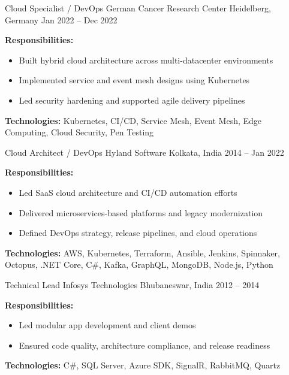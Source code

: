 \begin{cventries}
\cventry
  {Cloud Specialist / DevOps}
  {German Cancer Research Center}
  {Heidelberg, Germany}
  {Jan 2022 – Dec 2022}
  {
    \begin{cvitems}
      \item {\textbf{Responsibilities:}
        \begin{itemize}
          \item Built hybrid cloud architecture across multi-datacenter environments
          \item Implemented service and event mesh designs using Kubernetes
          \item Led security hardening and supported agile delivery pipelines\\
        \end{itemize}
      }
      \item {\textbf{Technologies:} Kubernetes, CI/CD, Service Mesh, Event Mesh, Edge Computing, Cloud Security, Pen Testing}\\
    \end{cvitems}
  }

\cventry
  {Cloud Architect / DevOps}
  {Hyland Software}
  {Kolkata, India}
  {2014 – Jan 2022}
  {
    \begin{cvitems}
      \item {\textbf{Responsibilities:}
        \begin{itemize}
          \item Led SaaS cloud architecture and CI/CD automation efforts
          \item Delivered microservices-based platforms and legacy modernization
          \item Defined DevOps strategy, release pipelines, and cloud operations\\
        \end{itemize}
      }
      \item {\textbf{Technologies:} AWS, Kubernetes, Terraform, Ansible, Jenkins, Spinnaker, Octopus, .NET Core, C\#, Kafka, GraphQL, MongoDB, Node.js, Python}\\
    \end{cvitems}
  }

\cventry
  {Technical Lead}
  {Infosys Technologies}
  {Bhubaneswar, India}
  {2012 – 2014}
  {
    \begin{cvitems}
      \item {\textbf{Responsibilities:}
        \begin{itemize}
          \item Led modular app development and client demos
          \item Ensured code quality, architecture compliance, and release readiness\\
        \end{itemize}
      }
      \item {\textbf{Technologies:} C\#, SQL Server, Azure SDK, SignalR, RabbitMQ, Quartz}\\
    \end{cvitems}
  }


\end{cventries}
